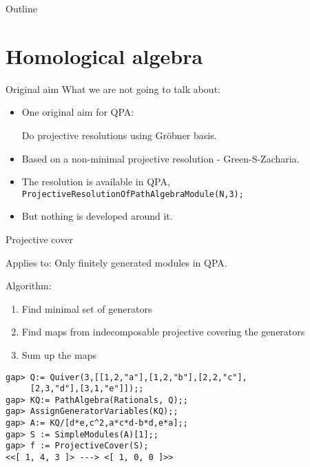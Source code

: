 \begin{frame}
  \titlepage
\end{frame}

\begin{frame}{Outline}
  \tableofcontents
\end{frame}

\section{Homological algebra}

\begin{frame}{Original aim}
What we are not going to talk about:
\begin{itemize}
\item One original aim for QPA: \parbox[t]{5cm}{Do projective resolutions
    using Gr\"obner basis.}
\pause
\item Based on a non-minimal projective resolution - Green-S-Zacharia.
\item The resolution is available in QPA, \\
          \texttt{ProjectiveResolutionOfPathAlgebraModule(N,3);}
\pause
\item But nothing is developed around it. 
\end{itemize}
\end{frame}

\begin{frame}[fragile]{Projective cover}

Applies to: Only finitely generated modules in QPA.\medskip

Algorithm:

\begin{enumerate}[\rm(1)] 
\item Find minimal set of generators
\item Find maps from indecomposable projective covering the generators
\item Sum up the maps
\end{enumerate}
\pause 
\begin{verbatim}
gap> Q:= Quiver(3,[[1,2,"a"],[1,2,"b"],[2,2,"c"],
     [2,3,"d"],[3,1,"e"]]);;
gap> KQ:= PathAlgebra(Rationals, Q);;
gap> AssignGeneratorVariables(KQ);;
gap> A:= KQ/[d*e,c^2,a*c*d-b*d,e*a];;
gap> S := SimpleModules(A)[1];;
gap> f := ProjectiveCover(S);
<<[ 1, 4, 3 ]> ---> <[ 1, 0, 0 ]>>
\end{verbatim}

\end{frame}

